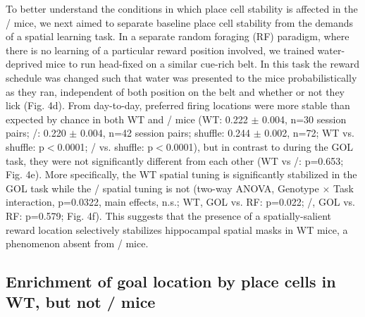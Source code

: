 To better understand the conditions in which place cell stability is affected in the \df/ mice, we next aimed to separate baseline place cell stability from the demands of a spatial learning task.  In a separate random foraging (RF) paradigm, where there is no learning of a particular reward position involved, we trained water-deprived mice to run head-fixed on a similar cue-rich belt. In this task the reward schedule was changed such that water was presented to the mice probabilistically as they ran, independent of both position on the belt and whether or not they lick (Fig. 4d). From day-to-day, preferred firing locations were more stable than expected by chance in both WT and \df/ mice (WT: 0.222 $\pm$ 0.004, n=30 session pairs; \df/: 0.220 $\pm$ 0.004, n=42 session pairs; shuffle: 0.244 $\pm$ 0.002, n=72; WT vs. shuffle: p$<$0.0001; \df/ vs. shuffle: p$<$0.0001), but in contrast to during the GOL task, they were not significantly different from each other (WT vs \df/: p=0.653; Fig. 4e). More specifically, the WT spatial tuning is significantly stabilized in the GOL task while the \df/ spatial tuning is not (two-way ANOVA, Genotype $\times$ Task interaction, p=0.0322, main effects, n.s.; WT, GOL vs. RF: p=0.022; \df/, GOL vs. RF: p=0.579; Fig. 4f). This suggests that the presence of a spatially-salient reward location selectively stabilizes hippocampal spatial masks in WT mice, a phenomenon absent from \df/ mice.

\subsection{Enrichment of goal location by place cells in WT, but not \df/ mice}

